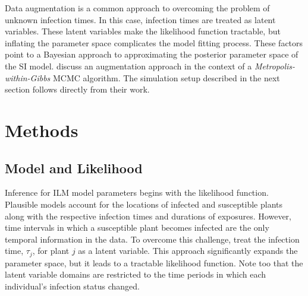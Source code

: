 \documentclass{uwstat572}
\begin{document}
Data augmentation is a common approach to overcoming the problem of unknown infection times. 
In this case, infection times are treated as latent variables. 
These latent variables make the likelihood function tractable, but inflating the parameter space complicates the model fitting process. 
These factors point to a Bayesian approach to approximating the posterior parameter space of the SI model. 
\citet{Jewell} discuss an augmentation approach in the context of a \textit{Metropolis-within-Gibbs} MCMC algorithm. 
The simulation setup described in the next section follows directly from their work. 

\section{Methods}
\subsection{Model and Likelihood}

Inference for ILM model parameters begins with the likelihood function. 
Plausible models account for the locations of infected and susceptible plants along with the respective infection times and durations of exposures. 
However, time intervals in which a susceptible plant becomes infected are the only temporal information in the data. 
To overcome this challenge, treat the infection time, $\tau_j$, for plant $j$ as a latent variable. 
This approach significantly expands the parameter space, but it leads to a tractable likelihood function. 
Note too that the latent variable domains are restricted to the time periods in which each individual's infection status changed. 
\end{document}
